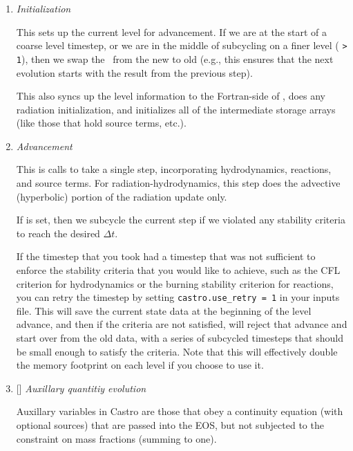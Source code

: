 \begin{enumerate}
\item {\em Initialization} 

  This sets up the current level for advancement.  If we are at the
  start of a coarse level timestep, or we are in the middle of
  subcycling on a finer level ( {\tt > 1}), then
  we swap the \statedata\ from the new to old (e.g., this ensures that
  the next evolution starts with the result from the previous step).

  This also syncs up the level information to the Fortran-side of
  \castro, does any radiation initialization, and initializes all of
  the intermediate storage arrays (like those that hold source terms,
  etc.).

\item {\em Advancement} 

  This is calls  to take a single step,
  incorporating hydrodynamics, reactions, and source terms.  For
  radiation-hydrodynamics, this step does the advective (hyperbolic)
  portion of the radiation update only.




  If  is set, then we subcycle the current
  step if we violated any stability criteria to reach the desired
  $\Delta t$. 

If the timestep that you took had a timestep that was not sufficient to
enforce the stability criteria that you would like to achieve, such as
the CFL criterion for hydrodynamics or the burning stability criterion
for reactions, you can retry the timestep by setting {\tt castro.use\_retry = 1}
in your inputs file. This will save the current state data at the beginning
of the level advance, and then if the criteria are not satisfied, will
reject that advance and start over from the old data, with a series of
subcycled timesteps that should be small enough to satisfy the criteria.
Note that this will effectively double the memory footprint on each level
if you choose to use it.


\item {[]} {\em Auxillary quantitiy evolution} 

  Auxillary variables in Castro are those that obey a continuity
  equation (with optional sources) that are passed into the EOS, but
  not subjected to the constraint on mass fractions (summing to one).


\end{enumerate}
